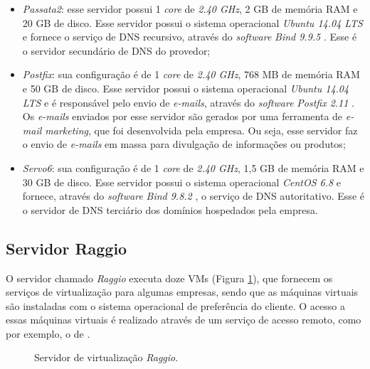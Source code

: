 \begin{itemize}
 \item \textit{Passata2}: esse servidor possui 1 \textit{core} de \textit{2.40 GHz}, 2 GB de memória \ac{RAM} e 20 GB de disco. 
 Esse servidor possui o sistema operacional \textit{Ubuntu 14.04 \ac{LTS}} \cite{ubuntu} e fornece o serviço de \ac{DNS} recursivo, através do 
 \textit{software} \textit{Bind 9.9.5} \cite{bind}. Esse é o servidor secundário de \ac{DNS} do provedor;
 
 \item \textit{Postfix}: sua configuração é de 1 \textit{core} de \textit{2.40 GHz}, 768 MB de memória \ac{RAM} e 50 GB de disco. 
 Esse servidor possui o sistema operacional \textit{Ubuntu 14.04 \ac{LTS}} \cite{ubuntu} e é responsável pelo envio de \textit{e-mails}, 
 através do \textit{software} \textit{Postfix 2.11} \cite{postfix}. Os \textit{e-mails} enviados por esse servidor são gerados por uma 
 ferramenta de \textit{e-mail marketing}, que foi desenvolvida pela empresa. Ou seja, esse servidor faz o envio de \textit{e-mails} em massa 
 para divulgação de informações ou produtos;
 
 \item \textit{Servo6}: sua configuração é de 1 \textit{core} de \textit{2.40 GHz}, 1,5 GB de memória \ac{RAM} e 30 GB de disco. 
 Esse servidor possui o sistema operacional \textit{CentOS 6.8} e fornece, através do \textit{software} \textit{Bind 9.8.2} \cite{bind}, o 
 serviço de \ac{DNS} autoritativo. Esse é o servidor de \ac{DNS} terciário dos domínios hospedados pela empresa.
\end{itemize}

\subsection{Servidor Raggio}
\label{section:serv_raggio}

O servidor chamado \textit{Raggio} executa doze \acp{VM} (Figura \ref{fig:servidor_raggio}), que fornecem os serviços de virtualização para algumas empresas,
sendo que as máquinas virtuais são instaladas com o sistema operacional de preferência do cliente. O acesso a essas máquinas virtuais é realizado
através de um serviço de acesso remoto, como por exemplo, o de  \cite{barrett2005}.

\begin{figure}[h!]
 \centering
 \caption{Servidor de virtualização \textit{Raggio}.}
 \label{fig:servidor_raggio}
\end{figure}

